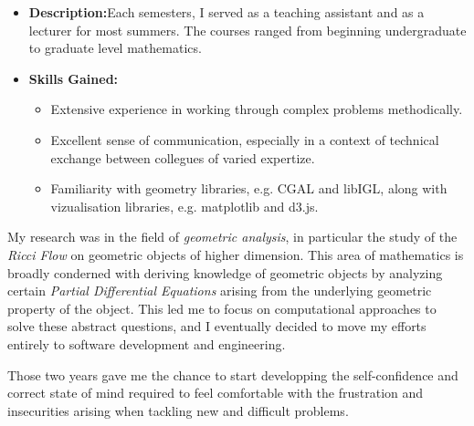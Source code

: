 \documentclass[10pt,a4paper,ragged2e,withhyper]{altacv}
\begin{document}
\begin{paracol}{2}
\divider

\begin{itemize}
\item \textbf{Description:}Each semesters, I served as a teaching assistant and as a
lecturer for most summers. The courses ranged from beginning
undergraduate to graduate level mathematics.

\item \textbf{Skills Gained:}
  \begin{itemize}
    \item Extensive experience in working through complex problems methodically.
    \item Excellent sense of communication, especially in a context of technical exchange between collegues of varied expertize.
    \item Familiarity with geometry libraries, e.g. CGAL and libIGL, along with vizualisation libraries, e.g. matplotlib and d3.js.
  \end{itemize}
\end{itemize}

\switchcolumn



My research was in the field of \emph{geometric analysis},
in particular the study of the \emph{Ricci Flow} on geometric objects of higher
dimension. This area of mathematics is
broadly conderned with deriving knowledge
of geometric objects by analyzing certain
\emph{Partial Differential Equations} arising from the
underlying geometric property of the object.
This led me to focus on computational
approaches to solve these abstract
questions, and I eventually decided to move
my efforts entirely to software development
and engineering.

\divider

Those two years gave me the chance to start developping the self-confidence and
correct state of mind required to feel comfortable with the frustration and
insecurities arising when tackling new and difficult problems.


\end{paracol}
\end{document}
